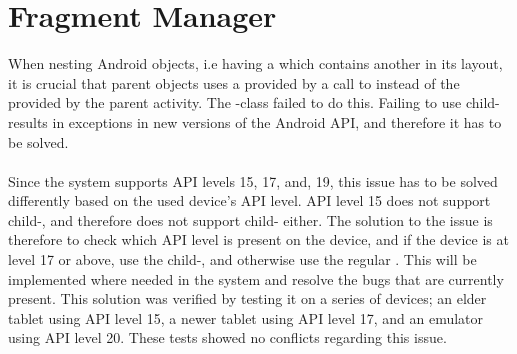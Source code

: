 \section{Fragment Manager}
\label{sec:fragment_manager}

When nesting Android  objects, i.e having a  which contains another  in its layout, it is crucial that parent  objects uses a  provided by a call to  instead of the  provided by the parent activity. The \giraf-class  failed to do this. Failing to use child- results in exceptions in new versions of the Android API, and therefore it has to be solved. 
\\\\
Since the \giraf system supports API levels 15, 17, and, 19, this issue has to be solved differently based on the used device's API level. API level 15 does not support child-, and therefore does not support child- either. The solution to the issue is therefore to check which API level is present on the device, and if the device is at level 17 or above, use the child-, and otherwise use the regular . This will be implemented where needed in the \giraf system and resolve the bugs that are currently present. This solution was verified by testing it on a series of devices; an elder tablet using API level 15, a newer tablet using API level 17, and an emulator using API level 20. These tests showed no conflicts regarding this issue.